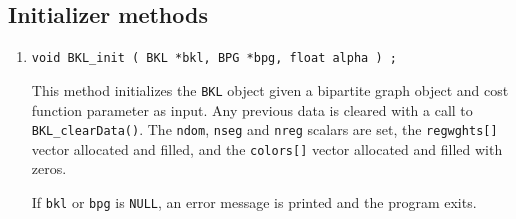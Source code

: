 \subsection{Initializer methods}
\label{subsection:BKL:proto:initializers}
\par
\begin{enumerate}
\item
\begin{verbatim}
void BKL_init ( BKL *bkl, BPG *bpg, float alpha ) ;
\end{verbatim}
This method initializes the {\tt BKL} object given a bipartite
graph object and cost function parameter as input.
Any previous data is cleared with a call to {\tt BKL\_clearData()}.
The {\tt ndom}, {\tt nseg} and {\tt nreg} scalars are set,
the {\tt regwghts[]} vector allocated and filled,
and
the {\tt colors[]} vector allocated and filled with zeros.
\par {}
If {\tt bkl} or {\tt bpg} is {\tt NULL},
an error message is printed and the program exits.
\end{enumerate}
\par
